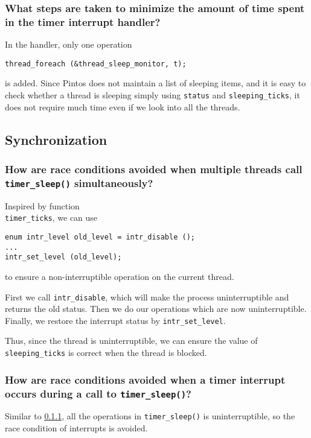 \documentclass[sigconf, nonacm]{acmart}
\begin{document}
            \subsubsection{What steps are taken to minimize the amount of time spent in the timer interrupt handler? } \label{Minimize timer interrupt handler}
                In the handler, only one operation
                \begin{verbatim}
thread_foreach (&thread_sleep_monitor, t);
                \end{verbatim}
                is added. Since Pintos does not maintain a list of sleeping items, and it is easy to check whether a thread is sleeping simply using \texttt{status} and \texttt{sleeping\_ticks}, it does not require much time even if we look into all the threads. 
        
        \subsection{Synchronization}
        
            \subsubsection{How are race conditions avoided when multiple threads call \texttt{timer\_sleep()} simultaneously? } \label{Race Conditions of Threads}
                Inspired by function \\\texttt{timer\_ticks}, we can use 
            \begin{verbatim}
enum intr_level old_level = intr_disable ();
...
intr_set_level (old_level);
\end{verbatim}
                to ensure a non-interruptible operation on the current thread. 
                
                First we call \texttt{intr\_disable}, which will make the process uninterruptible and returns the old status. Then we do our operations which are now uninterruptible. Finally, we restore the interrupt status by \texttt{intr\_set\_level}. 

                Thus, since the thread is uninterruptible, we can ensure the value of \texttt{sleeping\_ticks} is correct when the thread is blocked. 
            
            \subsubsection{How are race conditions avoided when a timer interrupt occurs during a call to \texttt{timer\_sleep()}? }
                Similar to \ref{Race Conditions of Threads}, all the operations in \texttt{timer\_sleep()} is uninterruptible, so the race condition of interrupts is avoided. 
        
\end{document}
